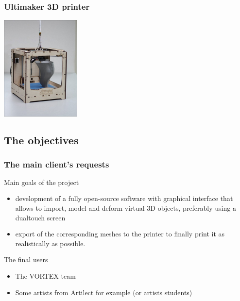 \documentclass{beamer}
\begin{document}
\begin{frame}
	\frametitle{Ultimaker 3D printer}

    \begin{center}
		\includegraphics[width=4cm]{Ultimaker}	
	\end{center}
    
\end{frame}

\subsection{The objectives}
\begin{frame}
	\frametitle{The main client's requests}
	\begin{block}{Main goals of the project} 
	\begin{itemize}	
		\item development of a fully open-source software with graphical interface that allows to import, model and deform virtual 3D objects, preferably using a dualtouch screen
		\item export of the corresponding meshes to the printer to finally print it as realistically as possible.
	\end{itemize}
    \end{block}
    
    \begin{block}{The final users}
    	\begin{itemize}
		\item The \textsc{VORTEX} team
		\item Some artists from Artilect for example (or artists students)
		\end{itemize}
    \end{block}
    
\end{frame}
\end{document}
